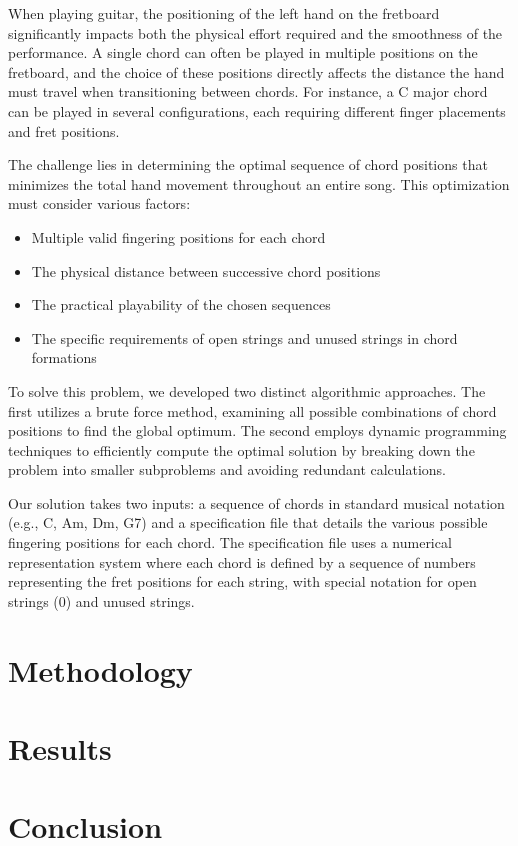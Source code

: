 \documentclass[conference]{IEEEtran}
\begin{document}
When playing guitar, the positioning of the left hand on the fretboard significantly impacts both the physical effort required and the smoothness of the performance. A single chord can often be played in multiple positions on the fretboard, and the choice of these positions directly affects the distance the hand must travel when transitioning between chords. For instance, a C major chord can be played in several configurations, each requiring different finger placements and fret positions.

The challenge lies in determining the optimal sequence of chord positions that minimizes the total hand movement throughout an entire song. This optimization must consider various factors:
\begin{itemize}
    \item Multiple valid fingering positions for each chord
    \item The physical distance between successive chord positions
    \item The practical playability of the chosen sequences
    \item The specific requirements of open strings and unused strings in chord formations
\end{itemize}

To solve this problem, we developed two distinct algorithmic approaches. The first utilizes a brute force method, examining all possible combinations of chord positions to find the global optimum. The second employs dynamic programming techniques to efficiently compute the optimal solution by breaking down the problem into smaller subproblems and avoiding redundant calculations.

Our solution takes two inputs: a sequence of chords in standard musical notation (e.g., C, Am, Dm, G7) and a specification file that details the various possible fingering positions for each chord. The specification file uses a numerical representation system where each chord is defined by a sequence of numbers representing the fret positions for each string, with special notation for open strings (0) and unused strings.

\section{Methodology}



\section{Results}


\section{Conclusion}



\end{document}
